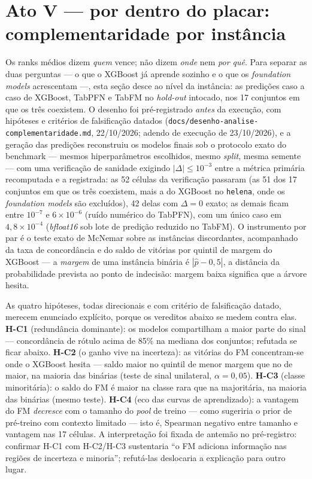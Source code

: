 \section{Ato V --- por dentro do placar: complementaridade por instância}
\label{sec:cap5-ato5}

Os ranks médios dizem \emph{quem} vence; não dizem \emph{onde} nem
\emph{por quê}. Para separar as duas perguntas --- o que o XGBoost já
aprende sozinho e o que os \emph{foundation models} acrescentam ---,
esta seção desce ao nível da instância: as predições caso a caso de
XGBoost, TabPFN e TabFM no \emph{hold-out} intocado, nos 17 conjuntos em
que os três coexistem. O desenho foi pré-registrado \emph{antes} da
execução, com hipóteses e critérios de falsificação datados
(\texttt{docs/\allowbreak desenho-\allowbreak analise-\allowbreak
complementaridade.\allowbreak md}, 22/10/2026; adendo de execução de
23/10/2026), e a geração das predições reconstruiu os modelos finais sob
o protocolo exato do benchmark --- mesmos hiperparâmetros escolhidos,
mesmo \emph{split}, mesma semente --- com uma verificação de sanidade
exigindo $|\Delta| \le 10^{-3}$ entre a métrica primária recomputada e a
registrada: as 52 células da verificação passaram (as 51 dos 17 conjuntos
em que os três coexistem, mais a do XGBoost no \texttt{helena}, onde
os \emph{foundation models} são excluídos), 42 delas com
$\Delta = 0$ exato; as
demais ficam entre $10^{-7}$ e $6 \times 10^{-6}$ (ruído numérico do
TabPFN), com um único caso em $4{,}8 \times 10^{-4}$ (\emph{bfloat16}
sob lote de predição reduzido no TabFM). O instrumento por par é
o teste exato de McNemar \citep{mcnemar1947} sobre as instâncias
discordantes, acompanhado
da taxa de concordância e do saldo de vitórias por quintil de margem do
XGBoost --- a \emph{margem} de uma instância binária é $|\hat p - 0{,}5|$,
a distância da probabilidade prevista ao ponto de indecisão: margem baixa
significa que a árvore hesita.

As quatro hipóteses, todas direcionais e com critério de falsificação
datado, merecem enunciado explícito, porque os vereditos abaixo se medem
contra elas. \textbf{H-C1} (redundância dominante): os modelos
compartilham a maior parte do sinal --- concordância de rótulo acima de
85\% na mediana dos conjuntos; refutada se ficar abaixo. \textbf{H-C2} (o
ganho vive na incerteza): as vitórias do FM concentram-se onde o XGBoost
hesita --- saldo maior no quintil de menor margem que no de maior, na
maioria das binárias (teste de sinal unilateral, $\alpha=0{,}05$).
\textbf{H-C3} (classe minoritária): o saldo do FM é maior na classe rara
que na majoritária, na maioria das binárias (mesmo teste). \textbf{H-C4}
(eco das curvas de aprendizado): a vantagem do FM \emph{decresce} com o
tamanho do \emph{pool} de treino --- como sugeriria o prior de pré-treino
com contexto limitado --- isto é, Spearman negativo entre tamanho e
vantagem nas 17 células. A interpretação foi fixada de antemão no
pré-registro: confirmar H-C1 com H-C2/H-C3 sustentaria ``o FM adiciona
informação nas regiões de incerteza e minoria''; refutá-las deslocaria a
explicação para outro lugar.

